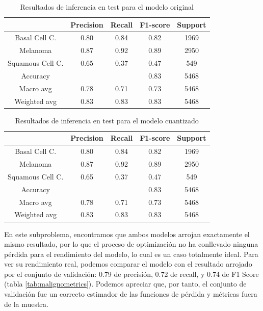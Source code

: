\begin{table}[!ht]
	\centering
	\begin{tabular}{|c|c|c|c|c|}
		\hline
		~ & Precision & Recall & F1-score & Support \\ \hline
		Basal Cell C. & 0.80 & 0.84 & 0.82 & 1969 \\
		Melanoma & 0.87 & 0.92 & 0.89 & 2950 \\
		Squamous Cell C. & 0.65 & 0.37 & 0.47 & 549 \\ \hline
		Accuracy & ~ & ~ & 0.83 & 5468 \\ \hline
		Macro avg & 0.78 & 0.71 & 0.73 & 5468 \\
		Weighted avg & 0.83 & 0.83 & 0.83 & 5468 \\ \hline
	\end{tabular}
	\caption{Resultados de inferencia en test para el modelo original}
	\label{tab:maltestorig}
\end{table}

\begin{table}[!ht]
	\centering
	\begin{tabular}{|c|c|c|c|c|}
		\hline
		~ & Precision & Recall & F1-score & Support \\ \hline
		Basal Cell C. & 0.80 & 0.84 & 0.82 & 1969 \\
		Melanoma & 0.87 & 0.92 & 0.89 & 2950 \\
		Squamous Cell C. & 0.65 & 0.37 & 0.47 & 549 \\ \hline
		Accuracy & ~ & ~ & 0.83 & 5468 \\ \hline
		Macro avg & 0.78 & 0.71 & 0.73 & 5468 \\
		Weighted avg & 0.83 & 0.83 & 0.83 & 5468 \\ \hline
	\end{tabular}
	\caption{Resultados de inferencia en test para el modelo cuantizado}
	\label{tab:maltestquant}
\end{table}

En este subproblema, encontramos que ambos modelos arrojan exactamente el mismo resultado, por lo que el proceso de optimización no ha conllevado ninguna pérdida para el rendimiento del modelo, lo cual es un caso totalmente ideal. Para ver su rendimiento real, podemos comparar el modelo con el resultado arrojado por el conjunto de validación:  0.79 de precisión,  0.72 de recall, y  0.74 de F1 Score (tabla \ref{tab:malignometrics}).  Podemos apreciar que, por tanto, el conjunto de validación fue un correcto estimador de las funciones de pérdida y métricas fuera de la muestra.

